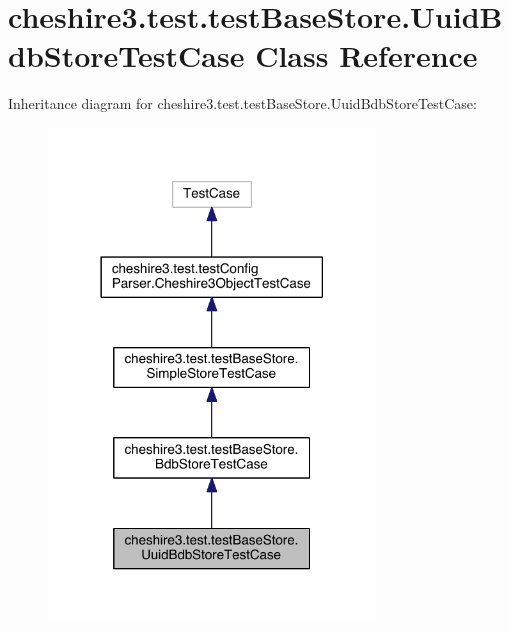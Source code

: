 \hypertarget{classcheshire3_1_1test_1_1test_base_store_1_1_uuid_bdb_store_test_case}{\section{cheshire3.\-test.\-test\-Base\-Store.\-Uuid\-Bdb\-Store\-Test\-Case Class Reference}
\label{classcheshire3_1_1test_1_1test_base_store_1_1_uuid_bdb_store_test_case}
}


Inheritance diagram for cheshire3.\-test.\-test\-Base\-Store.\-Uuid\-Bdb\-Store\-Test\-Case\-:
\nopagebreak
\begin{figure}[H]
\begin{center}
\leavevmode
\includegraphics[width=246pt]{classcheshire3_1_1test_1_1test_base_store_1_1_uuid_bdb_store_test_case__inherit__graph}
\end{center}
\end{figure}


